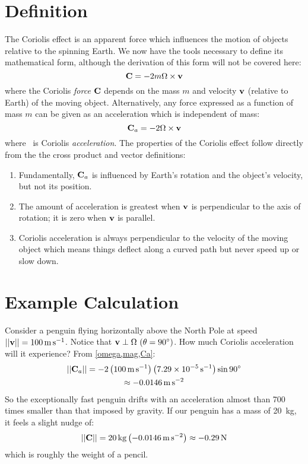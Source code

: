 \section{Definition}
The Coriolis effect is an apparent force which influences the motion of objects relative to the spinning Earth. We now have the tools necessary to define its mathematical form, although the derivation of this form will not be covered here:
\begin{equation}
    \textbf{C}=-2m\Omega\times\textbf{v}\label{Cf}
\end{equation}
where the Coriolis \emph{force} $\textbf{C}$ depends on the mass $m$ and velocity $\textbf{v}$ (relative to Earth) of the moving object.
Alternatively, any force expressed as a function of mass $m$ can be given as an acceleration which is independent of mass:
\begin{equation}
    \textbf{C$_a$}=-2\Omega\times\textbf{v}\label{Ca}
\end{equation}
where \vCa\ is Coriolis \emph{acceleration}. The properties of the Coriolis effect follow directly from the the cross product and vector definitions:
\begin{enumerate}
    \item Fundamentally, $\textbf{C$_a$}$ is influenced by Earth's rotation and the object's velocity, but not its position.
    \item The amount of acceleration is greatest when $\textbf{v}$ is perpendicular to the axis of rotation; it is zero when $\textbf{v}$ is parallel.
    \item Coriolis acceleration is always perpendicular to the velocity of the moving object which means things deflect along a curved path but never speed up or slow down.
\end{enumerate}

\section{Example Calculation}
Consider a penguin flying horizontally above the North Pole at speed $||\textbf{v}||=\qty{100}{\meter\per\second}$. Notice that $\vV\perp\av\ (\theta=\ang{90})$. How much Coriolis acceleration will it experience? From \cref{omega,mag,Ca}:
\begin{multline*}
||\textbf{C$_a$}||=-2\left(\qty{100}{\meter\per\second}\right)\left(\qty{7.29e-5}{\per\second}\right)\sin\ang{90}\\\approx\qty{-0.0146}{\meter\per\second\squared}
\end{multline*}
So the exceptionally fast penguin drifts with an acceleration almost than \num{700} times smaller than that imposed by gravity. If our penguin has a mass of \qty{20}{\kg}, it feels a slight nudge of:
\begin{equation*}
||\vCf||=\qty{20}{\kg}\left(\qty{-0.0146}{\meter\per\second\squared}\right)\approx\qty{-0.29}{\newton}
\end{equation*}
which is roughly the weight of a pencil.

